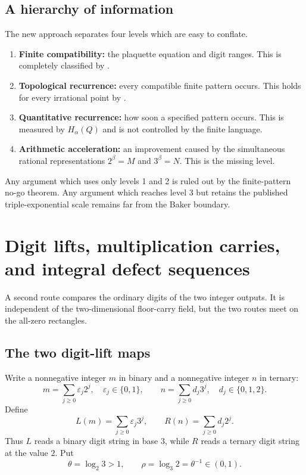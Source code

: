 \documentclass[11pt]{article}
\theoremstyle{definition}
\theoremstyle{remark}
\begin{document}
\subsection{A hierarchy of information}

The new approach separates four levels which are easy to conflate.
\begin{enumerate}
\item \textbf{Finite compatibility:} the plaquette equation and digit ranges.
This is completely classified by .
\item \textbf{Topological recurrence:} every compatible finite pattern occurs.
This holds for every irrational point by .
\item \textbf{Quantitative recurrence:} how soon a specified pattern occurs.
This is measured by $H_\alpha(Q)$ and is not controlled by the finite language.
\item \textbf{Arithmetic acceleration:} an improvement caused by the simultaneous
rational representations $2^\beta=M$ and $3^\beta=N$.  This is the missing level.
\end{enumerate}
Any argument which uses only levels 1 and 2 is ruled out by the finite-pattern no-go
theorem.  Any argument which reaches level 3 but retains the published
triple-exponential scale remains far from the Baker boundary.

\section{Digit lifts, multiplication carries, and integral defect sequences}
\label{sec:digit-lifts}

A second route compares the ordinary digits of the two integer outputs.  It is
independent of the two-dimensional floor-carry field, but the two routes meet on the
all-zero rectangles.

\subsection{The two digit-lift maps}

Write a nonnegative integer $m$ in binary and a nonnegative integer $n$ in ternary:
\begin{equation}\label{eq:digit-expansions}
 m=\sum_{j\ge0}\varepsilon_j2^j,
 \quad \varepsilon_j\in\{0,1\},
 \qquad
 n=\sum_{j\ge0}d_j3^j,
 \quad d_j\in\{0,1,2\}.
\end{equation}
Define
\begin{equation}\label{eq:digit-lift-definitions}
 L(m)=\sum_{j\ge0}\varepsilon_j3^j,
 \qquad
 R(n)=\sum_{j\ge0}d_j2^j.
\end{equation}
Thus $L$ reads a binary digit string in base $3$, while $R$ reads a ternary digit
string at the value $2$.  Put
\begin{equation}\label{eq:theta-rho}
 \theta=\log_2 3>1,
 \qquad
 \rho=\log_3 2=\theta^{-1}\in(0,1).
\end{equation}
\end{document}
